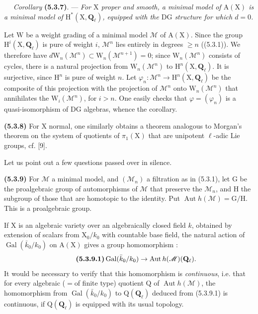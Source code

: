 \documentclass[11pt,leqno]{article}
\newcommand{\Page}[1]{\ifvmode\noindent\else\unskip\ \fi{\footnotesize\textcolor{gray}{[p.\,#1]}}\ \ignorespaces}
\begin{document}
\Page{242}
\textit{Corollary} \textbf{(5.3.7)}. — \textit{For \(\mathrm{X}\)
proper and smooth, a minimal model of \(\mathrm{A}(\mathrm{X})\) is a
minimal model of \(\mathrm{H}^*(\mathrm{X},\mathbf{Q}_\ell)\), equipped with
the \(\mathrm{DG}\) structure for which \(d=0\).}

Let \(\mathrm{W}\) be a weight grading of a minimal model
\(\mathscr{M}\) of \(\mathrm{A}(\mathrm{X})\). Since the group
\(\mathrm{H}^i(\mathrm{X},\mathbf{Q}_\ell)\) is pure of weight
\(i\), \(\mathscr{M}^n\) lies entirely in degrees \(\geq n\)
((5.3.1)). We therefore have
\(d\mathrm{W}_n(\mathscr{M}^n)\subset
\mathrm{W}_n(\mathscr{M}^{n+1})=0\); since
\(\mathrm{W}_n(\mathscr{M}^n)\) consists of cycles, there is a
natural projection from \(\mathrm{W}_n(\mathscr{M}^n)\) to
\(\mathrm{H}^n(\mathrm{X},\mathbf{Q}_\ell)\). It is surjective,
since \(\mathrm{H}^n\) is pure of weight \(n\). Let
\(\varphi_n:\mathscr{M}^n\to\mathrm{H}^n(\mathrm{X},\mathbf{Q}_\ell)\)
be the composite of this projection with the projection of \(\mathscr{M}^n\)
onto \(\mathrm{W}_n(\mathscr{M}^n)\) that annihilates the
\(\mathrm{W}_i(\mathscr{M}^n)\), for \(i>n\). One easily checks
that \(\varphi=(\varphi_n)\) is a quasi-isomorphism of
\(\mathrm{DG}\) algebras, whence the corollary.

\textbf{(5.3.8)} For \(\mathrm{X}\) normal, one similarly obtains a
theorem analogous to Morgan’s theorem on the system of quotients
of \(\pi_1(\mathrm{X})\) that are unipotent \(\ell\)-adic Lie groups,
cf. [9].

Let us point out a few questions passed over in silence.

\textbf{(5.3.9)} For \(\mathscr{M}\) a minimal model, and
\((\mathscr{M}_n)\) a filtration as in (5.3.1), let \(\mathrm{G}\)
be the proalgebraic group of automorphisms of \(\mathscr{M}\) that
preserve the \(\mathscr{M}_n\), and \(\mathrm{H}\) the subgroup of
those that are homotopic to the identity. Put
\(\operatorname{Aut}h(\mathscr{M})=\mathrm{G}/\mathrm{H}\).
This is a proalgebraic group.

If \(\mathrm{X}\) is an algebraic variety over an algebraically closed
field \(k\), obtained by extension of scalars from \(\mathrm{X}_0/k_0\)
with countable base field, the natural action of \(\operatorname{Gal}(\bar{k}_0/k_0)\)
on \(\mathrm{A}(\mathrm{X})\) gives a group homomorphism :
\[
\tag*{\textbf{(5.3.9.1)}}
\operatorname{Gal}(\bar{k}_0/k_0)
\to\operatorname{Aut}h(\mathscr{M})(\mathbf{Q}_\ell).
\]
It would be necessary to verify that this homomorphism is \textit{continuous}, i.e.
that for every algebraic (\(=\)of finite type) quotient \(\mathrm{Q}\)
of \(\operatorname{Aut}h(\mathscr{M})\), the homomorphism from
\(\operatorname{Gal}(\bar{k}_0/k_0)\) to \(\mathrm{Q}(\mathbf{Q}_\ell)\)
deduced from (5.3.9.1) is continuous, if \(\mathrm{Q}(\mathbf{Q}_\ell)\)
is equipped with its usual topology.
\end{document}
